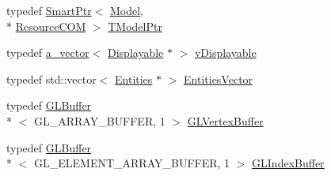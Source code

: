 \begin{DoxyCompactItemize}
\item 
typedef \hyperlink{class_agmd_utilities_1_1_smart_ptr}{Smart\+Ptr}$<$ \hyperlink{class_agmd_1_1_model}{Model}, \\*
\hyperlink{class_agmd_utilities_1_1_resource_c_o_m}{Resource\+C\+O\+M} $>$ \hyperlink{namespace_agmd_ad983a692239653fa2f9dfc95b7c98359}{T\+Model\+Ptr}
\item 
typedef \hyperlink{_vector_8h_a3df82cea60ff4ad0acb44e58454406a5}{a\+\_\+vector}$<$ \hyperlink{class_agmd_1_1_displayable}{Displayable} $\ast$ $>$ \hyperlink{namespace_agmd_a02598d92fb78e9179f0a1fb225f31df1}{v\+Displayable}
\item 
typedef std\+::vector$<$ \hyperlink{class_agmd_1_1_entities}{Entities} $\ast$ $>$ \hyperlink{namespace_agmd_aa240b1f8247099cfd97030903ede36b2}{Entities\+Vector}
\item 
typedef \hyperlink{class_agmd_1_1_g_l_buffer}{G\+L\+Buffer}\\*
$<$ G\+L\+\_\+\+A\+R\+R\+A\+Y\+\_\+\+B\+U\+F\+F\+E\+R, 1 $>$ \hyperlink{namespace_agmd_afae8d1b62c9b9eb380f73f5c34876c65}{G\+L\+Vertex\+Buffer}
\item 
typedef \hyperlink{class_agmd_1_1_g_l_buffer}{G\+L\+Buffer}\\*
$<$ G\+L\+\_\+\+E\+L\+E\+M\+E\+N\+T\+\_\+\+A\+R\+R\+A\+Y\+\_\+\+B\+U\+F\+F\+E\+R, 1 $>$ \hyperlink{namespace_agmd_a3039cf74b20e860514cf4997b04e85b4}{G\+L\+Index\+Buffer}
\end{DoxyCompactItemize}
